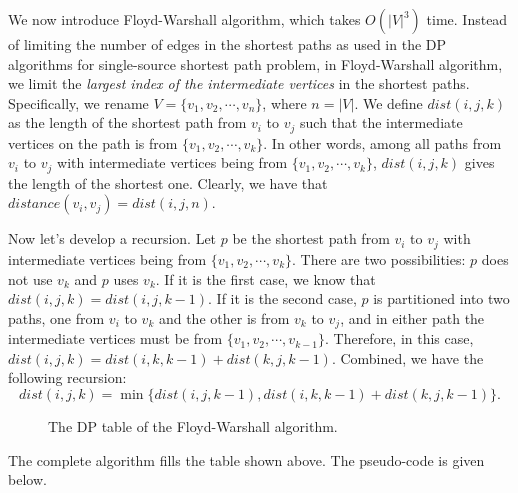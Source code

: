 We now introduce Floyd-Warshall algorithm, which takes $O(|V|^3)$ time.
Instead of limiting the number of edges in the shortest paths as used in the DP algorithms for single-source shortest path problem,
in Floyd-Warshall algorithm, we limit the \emph{largest index of the intermediate vertices} in the shortest paths.
Specifically, we rename $V = \{v_1, v_2, \cdots, v_n\}$, where $n = |V|$.
We define $dist(i,j,k)$ as the length of the shortest path from $v_i$ to $v_j$
such that the intermediate vertices on the path is from $\{v_1, v_2, \cdots, v_k\}$.
In other words, among all paths from $v_i$ to $v_j$ with 
intermediate vertices being from $\{v_1, v_2, \cdots, v_k\}$,
$dist(i,j,k)$ gives the length of the shortest one.
Clearly, we have that $distance(v_i, v_j) = dist(i, j, n)$.

Now let's develop a recursion.
Let $p$ be the shortest path from $v_i$ to $v_j$ with 
intermediate vertices being from $\{v_1, v_2, \cdots, v_k\}$.
There are two possibilities: $p$ does not use $v_k$ and $p$ uses $v_k$.
If it is the first case, we know that $dist(i,j,k) = dist(i,j,k-1)$.
If it is the second case, $p$ is partitioned into two paths, one from $v_i$ to $v_k$ and the other is from $v_k$ to $v_j$,
and in either path the 
intermediate vertices must be from $\{v_1, v_2, \cdots, v_{k-1}\}$.
Therefore, in this case, $dist(i,j,k) = dist(i,k,k-1) + dist(k,j,k-1)$.
Combined, we have the following recursion:
$$dist(i,j,k) = \min\{dist(i,j,k-1), dist(i,k,k-1) + dist(k,j,k-1)\}.$$

\begin{figure}[h]
\centering{}
\caption{The DP table of the Floyd-Warshall algorithm.}
\label{fig:dag}
\end{figure}

The complete algorithm fills the table shown above. 
The pseudo-code is given below.

\begin{minipage}{0.8\textwidth}
	\xxx
	\xxx
	\xxx
	\xxx
	\xxx
	\xxx
	\xxx
	\xxx
	\xxx
	\xxx
	\xxx
	\xxx
	\xxx
\end{minipage}




